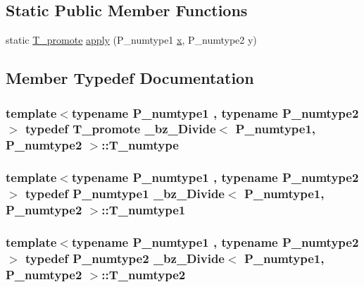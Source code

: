 \subsection*{Static Public Member Functions}
\begin{DoxyCompactItemize}
\item 
static \hyperlink{minmax_8h_aaa88a440c2f0d00798d5b1d42c79308d}{T\+\_\+promote} \hyperlink{class__bz__Divide_ae73a363b027f303051c4b1a2af1521f3}{apply} (P\+\_\+numtype1 \hyperlink{vecnorm1_8cc_ac73eed9e41ec09d58f112f06c2d6cb63}{x}, P\+\_\+numtype2 y)
\end{DoxyCompactItemize}


\subsection{Member Typedef Documentation}
\hypertarget{class__bz__Divide_acc1b7662baf0aaf8ef894ea02943e417}{}
\subsubsection[{T\+\_\+numtype}]{\setlength{\rightskip}{0pt plus 5cm}template$<$typename P\+\_\+numtype1 , typename P\+\_\+numtype2 $>$ typedef {\bf T\+\_\+promote} {\bf \+\_\+bz\+\_\+\+Divide}$<$ P\+\_\+numtype1, P\+\_\+numtype2 $>$\+::{\bf T\+\_\+numtype}}\label{class__bz__Divide_acc1b7662baf0aaf8ef894ea02943e417}
\hypertarget{class__bz__Divide_a8008af03ab1e9e33041d7b37287d56e0}{}
\subsubsection[{T\+\_\+numtype1}]{\setlength{\rightskip}{0pt plus 5cm}template$<$typename P\+\_\+numtype1 , typename P\+\_\+numtype2 $>$ typedef P\+\_\+numtype1 {\bf \+\_\+bz\+\_\+\+Divide}$<$ P\+\_\+numtype1, P\+\_\+numtype2 $>$\+::{\bf T\+\_\+numtype1}}\label{class__bz__Divide_a8008af03ab1e9e33041d7b37287d56e0}
\hypertarget{class__bz__Divide_a1925bff658537c3ad20c9f107cc1fb72}{}
\subsubsection[{T\+\_\+numtype2}]{\setlength{\rightskip}{0pt plus 5cm}template$<$typename P\+\_\+numtype1 , typename P\+\_\+numtype2 $>$ typedef P\+\_\+numtype2 {\bf \+\_\+bz\+\_\+\+Divide}$<$ P\+\_\+numtype1, P\+\_\+numtype2 $>$\+::{\bf T\+\_\+numtype2}}\label{class__bz__Divide_a1925bff658537c3ad20c9f107cc1fb72}


